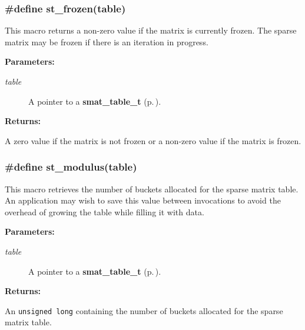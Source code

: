 \subsubsection{\setlength{\rightskip}{0pt plus 5cm}\#define st\_\-frozen(table)}\label{group__dbprim__smat_a24}




 This macro returns a non-zero value if the matrix is currently frozen. The sparse matrix may be frozen if there is an iteration in progress.\begin{Desc}
\item[{\bf Parameters: }]\par
\begin{description}
\item[
{\em table}]A pointer to a {\bf smat\_\-table\_\-t} {\rm (p.\,\pageref{group__dbprim__smat_a0})}.

\end{description}
\end{Desc}
\begin{Desc}
\item[{\bf Returns: }]\par
A zero value if the matrix is not frozen or a non-zero value if the matrix is frozen. \end{Desc}
\subsubsection{\setlength{\rightskip}{0pt plus 5cm}\#define st\_\-modulus(table)}\label{group__dbprim__smat_a25}




 This macro retrieves the number of buckets allocated for the sparse matrix table. An application may wish to save this value between invocations to avoid the overhead of growing the table while filling it with data.\begin{Desc}
\item[{\bf Parameters: }]\par
\begin{description}
\item[
{\em table}]A pointer to a {\bf smat\_\-table\_\-t} {\rm (p.\,\pageref{group__dbprim__smat_a0})}.

\end{description}
\end{Desc}
\begin{Desc}
\item[{\bf Returns: }]\par
An {\tt unsigned long} containing the number of buckets allocated for the sparse matrix table. \end{Desc}
